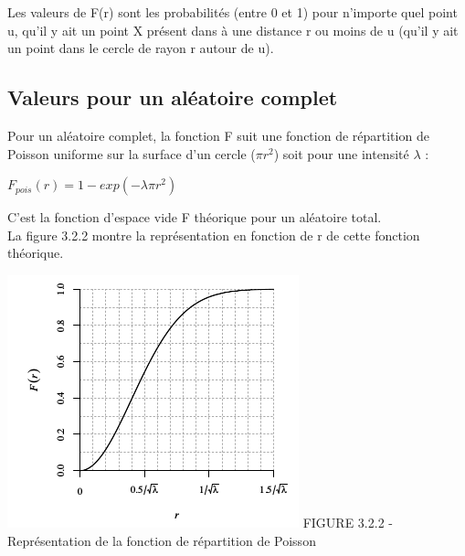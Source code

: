 \documentclass[french,12pt,a4paper]{report}
\begin{document}
Les valeurs de F(r) sont les probabilités (entre 0 et 1) pour n'importe quel point u, qu'il y ait un point X présent dans à une distance r ou moins de u (qu'il y ait un point dans le cercle de rayon r autour de u).\\


\subsection{Valeurs pour un aléatoire complet}

\begin{minipage}{0.45\linewidth}
Pour un aléatoire complet, la fonction F suit une fonction de répartition de Poisson uniforme sur la surface d'un cercle (\begin{math} \pi r^2 \end{math}) soit pour une intensité \begin{math} \lambda \end{math} : 
\begin{center}\begin{math} F_{pois}(r) = 1 - exp(-\lambda \pi r^2) \end{math}\end{center}
C'est la fonction d'espace vide F théorique pour un aléatoire total.\\
La figure 3.2.2 montre la représentation en fonction de r de cette fonction théorique.
\end{minipage}\hfill
\begin{minipage}{0.45\linewidth}
\includegraphics[scale=0.7]{images/poisson.png}
\small{FIGURE 3.2.2 - Représentation de la fonction de répartition de Poisson}
\end{minipage}

\end{document}
